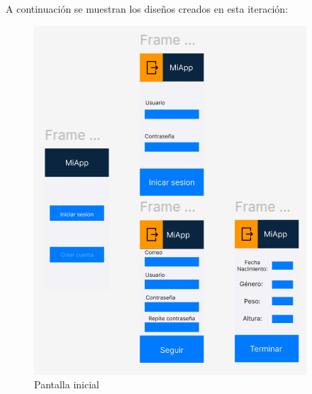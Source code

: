 A continuación se muestran los diseños creados en esta iteración:

\begin{figure}[H]
  \centering
  \begin{minipage}[b]{0.6\textwidth}
    \centering
    \includegraphics[width=\textwidth]{fotos/Init.png}
    \caption{Pantalla inicial}
    \label{fig:Pantalla inicial}
  \end{minipage}
  \hfill
  \begin{minipage}[b]{0.35\textwidth}
    \centering

\end{minipage}
\end{figure}
